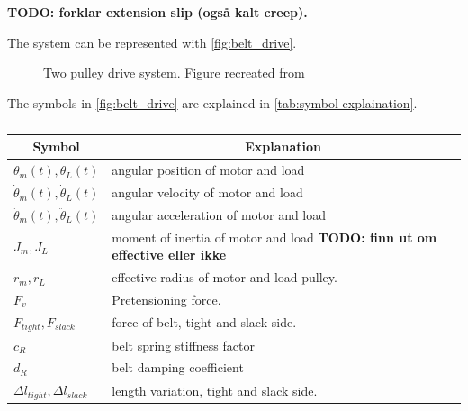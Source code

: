 \textbf{TODO: forklar extension slip (også kalt creep).}

The system can be represented with \autoref{fig:belt_drive}.

\begin{figure}[htbp]
	\centering
	
	\caption{Two pulley drive system. Figure recreated from \cite{isermann2005mechatronic}}
	\label{fig:belt_drive}
\end{figure}

The symbols in \autoref{fig:belt_drive} are explained in \autoref{tab:symbol-explaination}.

\begin{table}[h]
	\caption{}\label{tab:symbol-explaination}
	\begin{center}
		\begin{tabular}[c]{l|l}
			\hline
			\multicolumn{1}{c|}{\textbf{Symbol}}    &
			\multicolumn{1}{c}{\textbf{Explanation}}                                                                                     \\
			\hline
			$\theta_m(t),\theta_L(t)$               & angular position of motor and load                                                 \\
			$\dot{\theta}_m(t),\dot{\theta}_L(t)$   & angular velocity of motor and load                                                 \\
			$\ddot{\theta}_m(t),\ddot{\theta}_L(t)$ & angular acceleration of motor and load                                             \\
			$J_m, J_L$                              & moment of inertia of motor and load \textbf{TODO: finn ut om effective eller ikke} \\
			$r_m, r_L$                              & effective radius of motor and load pulley.                                         \\
			$F_v$                                   & Pretensioning force.                                                               \\
			$F_{tight}, F_{slack}$                  & force of belt, tight and slack side.                                               \\
			$c_R$                                   & belt spring stiffness factor                                                       \\
			$d_R$                                   & belt damping coefficient                                                           \\
			$\Delta l_{tight}, \Delta l_{slack} $   & length variation, tight and slack side.                                            \\
			\hline
		\end{tabular}
	\end{center}
\end{table}

